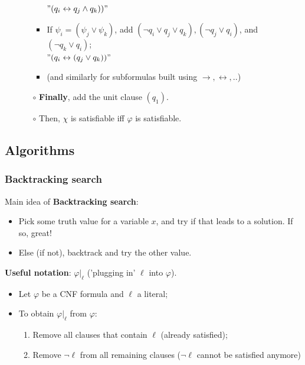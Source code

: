 \begin{itemize}
\begin{itemize}
\begin{itemize}
            $"(q_{i} \leftrightarrow q_{j} \wedge q_{k}))"$
            \\
            \item If $\psi_{i}=\left(\psi_{j} \vee \psi_{k}\right)$, \;\;\;\; add $\left(\neg q_{i} \vee q_{j} \vee q_{k}\right),\left(\neg q_{j} \vee q_{i}\right)$, and $\left(\neg q_{k} \vee q_{i}\right)$; \\
            $"(q_{i} \leftrightarrow (q_{j} \vee q_{k}))"$
            \\
            \item (and similarly for subformulas built using $\rightarrow, \leftrightarrow, ..$)
        \end{itemize} 
        \item[$\circ$] \textbf{Finally}, add the unit clause $(q_1)$.
        \item[$\circ$] Then, $\chi$ is satisfiable iff $\varphi$ is satisfiable. 
    \end{itemize}
\end{itemize}

\subsection{Algorithms}
\subsubsection{Backtracking search}
Main idea of \textbf{\textcolor{PineGreen}{Backtracking search}}:
\begin{itemize}
    \item Pick some truth value for a variable $x$, and try if that leads to a solution. If so, great!
    \item Else (if not), backtrack and try the other value.
\end{itemize}

\textbf{Useful notation}: $\left.\varphi\right|_{\ell}$ ('plugging in' $\ell$ into $\varphi$).
\begin{itemize}
    \item Let $\varphi$ be a CNF formula and $\ell$ a literal;
    \item To obtain $\left.\varphi\right|_{\ell}$ from $\varphi$:
    \begin{enumerate}
        \item Remove all clauses that contain $\ell$ (already satisfied);
        \item Remove $\neg \ell$ from all remaining clauses ($\neg \ell$ cannot be satisfied anymore)
    \end{enumerate}
\end{itemize}

